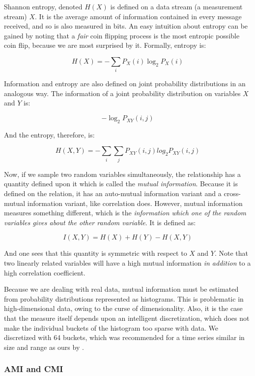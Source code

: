 \documentclass[12pt]{article}
\begin{document}
Shannon entropy, denoted $H(X)$ is defined on a data stream (a measurement stream) $X$. It is the average amount of information contained in every message received, and so is also measured in bits. An easy intuition about entropy can be gained by noting that a \emph{fair} coin flipping process is the most entropic possible coin flip, because we are most surprised by it. Formally, entropy is:

$$H(X) = -\sum_i P_X(i) \log_2 P_X(i)$$

Information and entropy are also defined on joint probability distributions in an analogous way. The information of a joint probability distribution on variables $X$ and $Y$ is:

$$ -\log_2 P_{XY}(i, j) $$

And the entropy, therefore, is:

$$H(X, Y) = -\sum_i \sum_j P_{XY}(i, j) log_2 P_{XY}(i, j)$$

Now, if we sample two random variables simultaneously, the relationship has a quantity defined upon it which is called the \emph{mutual information}. Because it is defined on the relation, it has an auto-mutual information variant and a cross-mutual information variant, like correlation does. However, mutual information measures something different, which is the \emph{information which one of the random variables gives about the other random variable}. It is defined as:

$$I(X, Y) = H(X) + H(Y) - H(X, Y)$$

And one sees that this quantity is symmetric with respect to $X$ and $Y$. Note that two linearly related variables will have a high mutual information \emph{in addition} to a high correlation coefficient.

Because we are dealing with real data, mutual information must be estimated from probability distributions represented as histograms. This is problematic in high-dimensional data, owing to the curse of dimensionality\cite{bellman}. Also, it is the case that the measure itself depends upon an intelligent discretization, which does not make the individual buckets of the histogram too sparse with data\cite{alzheimersmi}. We discretized with 64 buckets, which was recommended for a time series similar in size and range as ours by \cite{alzheimersmi}.

\subsubsection{AMI and CMI}
\end{document}
